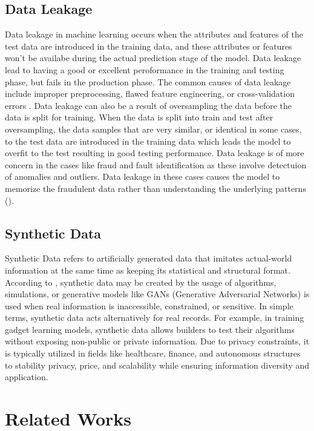 \documentclass[twoside,11pt]{article}
\begin{document}
\subsection{Data Leakage}
Data leakage in machine learning occurs when the attributes and features of the test data are introduced in the training data, and these attributes or features won't be availabe during the actual prediction stage of the model. Data leakage lead to having a good or excellent peroformance in the training and testing phase, but fails in the production phase. The common causes of data leakage include improper preprocessing, flawed feature engineering, or cross-validation errors \cite{Kaufman2012}. Data leakage can also be a result of oversampling the data before the data is split for training. When the data is split into train and test after oversampling, the data samples that are very similar, or identical in some cases, to the test data are introduced in the training data which leads the model to overfit to the test resulting in good testing performance. Data leakage is of more concern in the cases like fraud and fault identification as these involve detectuion of anomalies and outliers. Data leakage in these cases causes the model to memorize the fraudulent data rather than understanding the underlying patterns (\citealp{baesensRobROSERobustApproach2021}).

\subsection{Synthetic Data}
Synthetic Data refers to artificially generated data that imitates actual-world information at the same time as keeping its statistical and structural format. According to \citealp{SyntheticPatki2016}, synthetic data may be created by the usage of algorithms, simulations, or generative models like GANs (Generative Adversarial Networks) is used when real information is inaccessible, constrained, or sensitive.
In simple terms, synthetic data acts alternatively for real records. For example, in training gadget learning models, synthetic data allows builders to test their algorithms without exposing non-public or private information. Due to privacy constraints, it is typically utilized in fields like healthcare, finance, and autonomous structures to stability privacy, price, and scalability while ensuring information diversity and application.

\section{Related Works}\label{sec:relatedwork}
\end{document}
